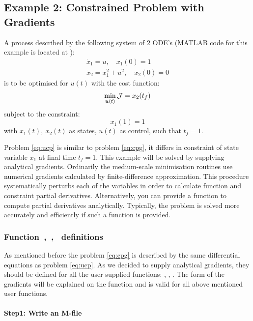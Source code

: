 \subsection{Example 2: Constrained Problem with Gradients}
\label{sec:conprobgrad}

A process described by the following system of 2
ODE's \citep{raj01,luu91} (MATLAB code for this example is located
at ):   
\begin{gather}
\dot{x}_1 = u, \quad x_{1}(0) = 1\\
\dot{x}_2 = x^{2}_{1} + u^{2}, \quad x_{2}(0) = 0
\end{gather} is to be optimised for $u(t)$ with the cost function:
\begin{equation}
\min_{\ve{u}(t)} \mf{J} = x_{2}(t_{f}) \label{eq:cpg} 
\end{equation} subject to the constraint:
\begin{equation}
x_{1}(1) = 1
\end{equation} with $x_{1}(t),~x_{2}(t)$ as states, $u(t)$ as control,
such that $t_{f} = 1$. 

Problem \eqref{eq:ucp} is similar to problem \eqref{eq:cpg}, it 
differs in constraint of state variable $x_{1}$ at final time
$t_{f}=1$. This example will be solved by supplying analytical
gradients. Ordinarily the medium-scale minimisation routines use
numerical gradients calculated by finite-difference
approximation. This procedure systematically perturbs each of the
variables in order to calculate function and constraint partial
derivatives. Alternatively, you can provide a function to compute 
partial derivatives analytically. Typically, the problem is solved
more accurately and efficiently if such a function is provided. 

\subsubsection{Function~,~,~  definitions}
\label{sec:conprobgrad-fundef}

As mentioned before the problem \eqref{eq:cpg} is described by the
same differential equations as problem \eqref{eq:ucp}. As we decided
to supply analytical gradients, they should be defined for all the
user supplied functions: , ,
. The form of the gradients will be explained on the
function  and is valid for all above mentioned user
functions.  

\paragraph{Step1: Write an M-file~}

